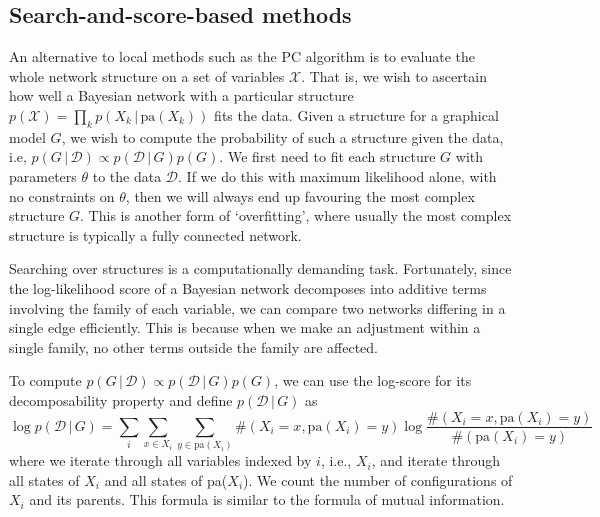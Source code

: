 \documentclass{article}
\newcommand{\giv}{\,|\,}
\begin{document}
\subsection{Search-and-score-based methods}

An alternative to local methods such as the PC algorithm is to evaluate the whole network structure on a set of variables $\mathcal{X}$. That is, we wish to ascertain how well a Bayesian network with a particular structure $p(\mathcal{X}) = \prod_k p(X_k \giv \text{pa}(X_k))$ fits the data. Given a structure for a graphical model $G$, we wish to compute the probability of such a structure given the data, i.e, $p(G \giv \mathcal{D}) \propto p(\mathcal{D} \giv G) p(G)$. We first need to fit each structure $G$ with parameters $\theta$ to the data $\mathcal{D}$. If we do this with maximum likelihood alone, with no constraints on $\theta$, then we will always end up favouring the most complex structure $G$. This is another form of `overfitting', where usually the most complex structure is typically a fully connected network. 

Searching over structures is a computationally demanding task. Fortunately, since the log-likelihood score of a Bayesian network decomposes into additive terms involving the family of each variable, we can compare two networks differing in a single edge efficiently. This is because when we make an adjustment within a single family, no other terms outside the family are affected. 

To compute $p(G \giv \mathcal{D}) \propto p(\mathcal{D} \giv G) p(G)$, we can use the log-score for its decomposability property and define $p(\mathcal{D} \giv G)$ as
$$
    \log p(\mathcal{D} \giv G) = \sum_i\sum_{x \in X_i}\sum_{y \in \text{pa}(X_i)} \#(X_i = x, \text{pa}(X_i) = y) \log \frac{\#(X_i = x, \text{pa}(X_i) = y)}{\#(\text{pa}(X_i) = y)}
$$
\noindent where we iterate through all variables indexed by $i$, i.e., $X_i$, and iterate through all states of $X_i$ and all states of pa($X_i$). We count the number of configurations of $X_i$ and its parents. This formula is similar to the formula of mutual information. 
\end{document}
